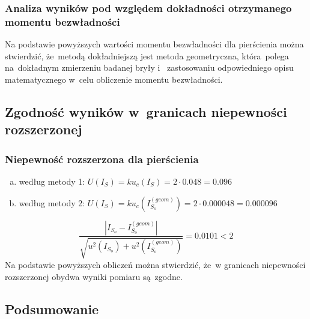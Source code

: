 \documentclass{fizraport}
\begin{document}
\subsubsection{Analiza wyników pod względem dokładności otrzymanego momentu bezwładności}
Na podstawie powyższych wartości momentu bezwładności dla pierścienia można stwierdzić, że~metodą dokładniejszą jest metoda geometryczna, która~polega na~dokładnym zmierzeniu badanej bryły i~ zastosowaniu odpowiedniego opisu matematycznego w~celu obliczenie momentu bezwładności.

\subsection{Zgodność wyników w~granicach niepewności rozszerzonej}
\subsubsection{Niepewność rozszerzona dla pierścienia}
\begin{enumerate}[a)]
    \item {według metody 1: $U(I_S) =k u_c(I_S) =2 \cdot 0.048 = 0.096 $}
    \item według metody 2: $U(I_S) =ku_c\left(I_{S_o}^{(geom)}\right)=2 \cdot 0.000048= 0.000096 $
\end{enumerate}
\[\frac{\left| I_{S_o} -I_{S_o}^{(geom)} \right|}{\sqrt{u^2(I_{S_o})+u^2(I_{S_o}^{(geom)})}}=0.0101 < 2\]
Na podstawie powyższych obliczeń można stwierdzić, że~w granicach niepewności rozszerzonej obydwa wyniki pomiaru są~zgodne.

\subsection{Podsumowanie}
\end{document}
